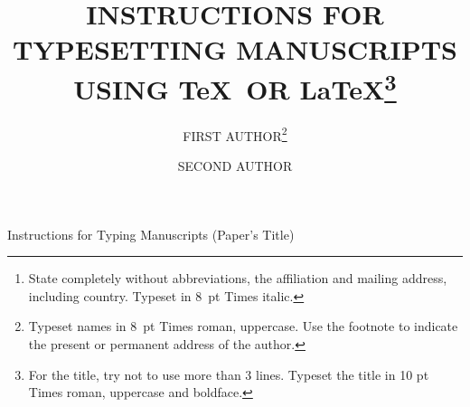 \documentclass{ws-ijait}
\begin{document}
{Instructions for Typing Manuscripts (Paper's Title)}

%
\catchline{}{}{}{}{}
%

\title{INSTRUCTIONS FOR TYPESETTING MANUSCRIPTS\\
    USING \TeX\ OR \LaTeX\footnote{For the title, try not to use more than 
        3 lines. Typeset the title in 10 pt Times roman, uppercase and 
    boldface.}
}

\author{\footnotesize FIRST AUTHOR\footnote{
        Typeset names in 8~pt Times roman, uppercase. Use the footnote 
to indicate the present or permanent address of the author.}}

\address{University Department, University Name, Address\\
    City, State ZIP/Zone,
    Country\footnote{State completely without abbreviations, the
        affiliation and mailing address, including country. Typeset in 8~pt
    Times italic.}\\
first\_author@university.edu}

\author{SECOND AUTHOR}

\address{Group, Laboratory, Address\\
    City, State ZIP/Zone, Country\\
second\_author@group.com}

\maketitle

\begin{history}
\end{history}
\end{document}
